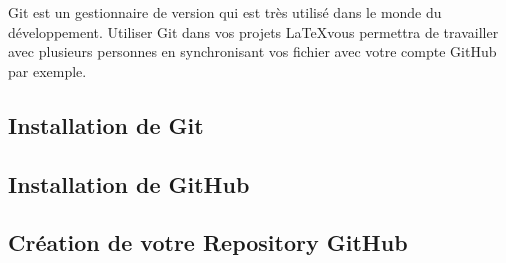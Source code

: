 \documentclass[../main.tex]{subfiles}
\begin{document}
Git est un gestionnaire de version qui est très utilisé dans le monde du développement. Utiliser Git dans vos projets \LaTeX vous permettra de travailler avec plusieurs personnes en synchronisant vos fichier avec votre compte GitHub par exemple.

\subsection{Installation de Git}

\subsection{Installation de GitHub}

\subsection{Création de votre Repository GitHub}
\end{document}
